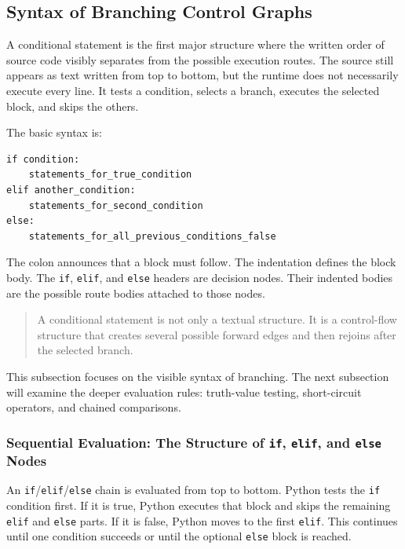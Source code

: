 \subsection{Syntax of Branching Control Graphs}

A conditional statement is the first major structure where the written order of source code visibly separates from the possible execution routes. The source still appears as text written from top to bottom, but the runtime does not necessarily execute every line. It tests a condition, selects a branch, executes the selected block, and skips the others.

The basic syntax is:

\begin{verbatim}
if condition:
    statements_for_true_condition
elif another_condition:
    statements_for_second_condition
else:
    statements_for_all_previous_conditions_false
\end{verbatim}

The colon announces that a block must follow. The indentation defines the block body. The \texttt{if}, \texttt{elif}, and \texttt{else} headers are decision nodes. Their indented bodies are the possible route bodies attached to those nodes.

\begin{quote}
A conditional statement is not only a textual structure. It is a control-flow structure that creates several possible forward edges and then rejoins after the selected branch.
\end{quote}

This subsection focuses on the visible syntax of branching. The next subsection will examine the deeper evaluation rules: truth-value testing, short-circuit operators, and chained comparisons.

\subsubsection{Sequential Evaluation: The Structure of \texttt{if}, \texttt{elif}, and \texttt{else} Nodes}

An \texttt{if}/\texttt{elif}/\texttt{else} chain is evaluated from top to bottom. Python tests the \texttt{if} condition first. If it is true, Python executes that block and skips the remaining \texttt{elif} and \texttt{else} parts. If it is false, Python moves to the first \texttt{elif}. This continues until one condition succeeds or until the optional \texttt{else} block is reached.

